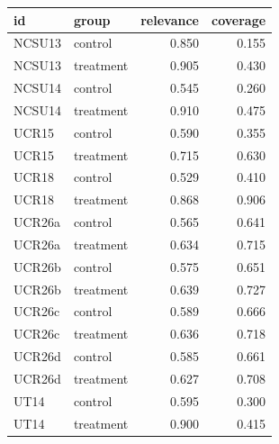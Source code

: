 \begin{tabular}{llrr}
\toprule
id & group & relevance & coverage \\
\midrule
NCSU13 & control & 0.850 & 0.155 \\
NCSU13 & treatment & 0.905 & 0.430 \\
NCSU14 & control & 0.545 & 0.260 \\
NCSU14 & treatment & 0.910 & 0.475 \\
UCR15 & control & 0.590 & 0.355 \\
UCR15 & treatment & 0.715 & 0.630 \\
UCR18 & control & 0.529 & 0.410 \\
UCR18 & treatment & 0.868 & 0.906 \\
UCR26a & control & 0.565 & 0.641 \\
UCR26a & treatment & 0.634 & 0.715 \\
UCR26b & control & 0.575 & 0.651 \\
UCR26b & treatment & 0.639 & 0.727 \\
UCR26c & control & 0.589 & 0.666 \\
UCR26c & treatment & 0.636 & 0.718 \\
UCR26d & control & 0.585 & 0.661 \\
UCR26d & treatment & 0.627 & 0.708 \\
UT14 & control & 0.595 & 0.300 \\
UT14 & treatment & 0.900 & 0.415 \\
\bottomrule
\end{tabular}
